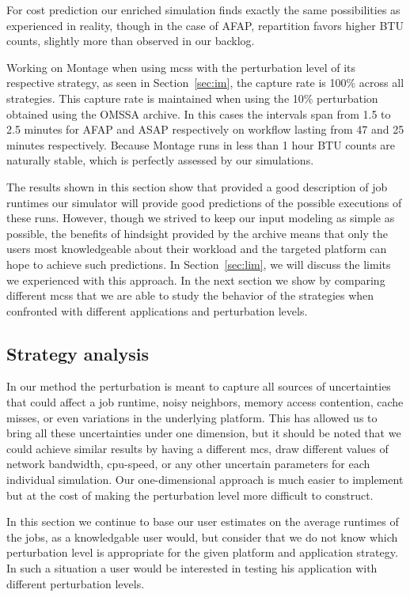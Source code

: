 \documentclass[10pt,conference,compsocconf]{IEEEtran}
\begin{document}
For cost prediction our enriched  simulation finds exactly the same possibilities
as experienced in reality, though in  the case of AFAP, repartition favors higher
BTU counts, slightly more than observed in our backlog.

Working on Montage when using \acp{mcs} with the perturbation level of its
respective strategy, as seen in Section~\ref{sec:im}, the capture rate is 100\%
across all strategies. This capture rate is maintained when using the 10\%
perturbation obtained using the OMSSA archive. In this cases the intervals span
from 1.5 to 2.5 minutes for AFAP and ASAP respectively on workflow lasting from
47 and 25 minutes respectively. Because Montage runs in less than 1 hour BTU 
counts are naturally stable, which is perfectly assessed by our simulations.

The results shown in  this section show that provided a  good description of job
runtimes our simulator will provide  good predictions of the possible executions
of these runs. However, though we strived to keep our input modeling as simple
as possible, the  benefits of hindsight provided by the  archive means that only
the users most knowledgeable about their  workload and the targeted platform can
hope to achieve such predictions.  In Section~\ref{sec:lim}, we will discuss the
limits we experienced with this approach. In the next section we show by comparing
different \acp{mcs}  that we are able  to study the behavior  of the strategies
when confronted with different applications and perturbation levels.


\subsection{Strategy analysis}\label{sec:sa}

In our method the perturbation is meant to capture all sources of uncertainties
that could affect a job runtime, noisy neighbors, memory access contention,
cache misses, or even variations in the underlying platform. This has allowed us
to bring all these uncertainties under one dimension, but it should be noted that
we could achieve similar results by having a different \ac{mcs}, draw different values
of network bandwidth, cpu-speed, or any other uncertain parameters for each
individual simulation. Our one-dimensional approach is much easier to implement
but at the cost of making the perturbation level more difficult to construct.

In this section we  continue to base our user estimates  on the average runtimes
of the  jobs, as a  knowledgable user  would, but consider  that we do  not know
which perturbation  level is appropriate for the given platform  and application
strategy.   In such  a  situation a  user  would be  interested  in testing  his
application with different perturbation levels.
\end{document}
